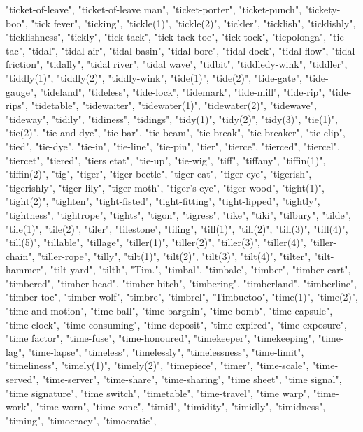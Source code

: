 "ticket-of-leave",
"ticket-of-leave man",
"ticket-porter",
"ticket-punch",
"tickety-boo",
"tick fever",
"ticking",
"tickle(1)",
"tickle(2)",
"tickler",
"ticklish",
"ticklishly",
"ticklishness",
"tickly",
"tick-tack",
"tick-tack-toe",
"tick-tock",
"ticpolonga",
"tic-tac",
"tidal",
"tidal air",
"tidal basin",
"tidal bore",
"tidal dock",
"tidal flow",
"tidal friction",
"tidally",
"tidal river",
"tidal wave",
"tidbit",
"tiddledy-wink",
"tiddler",
"tiddly(1)",
"tiddly(2)",
"tiddly-wink",
"tide(1)",
"tide(2)",
"tide-gate",
"tide-gauge",
"tideland",
"tideless",
"tide-lock",
"tidemark",
"tide-mill",
"tide-rip",
"tide-rips",
"tidetable",
"tidewaiter",
"tidewater(1)",
"tidewater(2)",
"tidewave",
"tideway",
"tidily",
"tidiness",
"tidings",
"tidy(1)",
"tidy(2)",
"tidy(3)",
"tie(1)",
"tie(2)",
"tie and dye",
"tie-bar",
"tie-beam",
"tie-break",
"tie-breaker",
"tie-clip",
"tied",
"tie-dye",
"tie-in",
"tie-line",
"tie-pin",
"tier",
"tierce",
"tierced",
"tiercel",
"tiercet",
"tiered",
"tiers etat",
"tie-up",
"tie-wig",
"tiff",
"tiffany",
"tiffin(1)",
"tiffin(2)",
"tig",
"tiger",
"tiger beetle",
"tiger-cat",
"tiger-eye",
"tigerish",
"tigerishly",
"tiger lily",
"tiger moth",
"tiger's-eye",
"tiger-wood",
"tight(1)",
"tight(2)",
"tighten",
"tight-fisted",
"tight-fitting",
"tight-lipped",
"tightly",
"tightness",
"tightrope",
"tights",
"tigon",
"tigress",
"tike",
"tiki",
"tilbury",
"tilde",
"tile(1)",
"tile(2)",
"tiler",
"tilestone",
"tiling",
"till(1)",
"till(2)",
"till(3)",
"till(4)",
"till(5)",
"tillable",
"tillage",
"tiller(1)",
"tiller(2)",
"tiller(3)",
"tiller(4)",
"tiller-chain",
"tiller-rope",
"tilly",
"tilt(1)",
"tilt(2)",
"tilt(3)",
"tilt(4)",
"tilter",
"tilt-hammer",
"tilt-yard",
"tilth",
"Tim.",
"timbal",
"timbale",
"timber",
"timber-cart",
"timbered",
"timber-head",
"timber hitch",
"timbering",
"timberland",
"timberline",
"timber toe",
"timber wolf",
"timbre",
"timbrel",
"Timbuctoo",
"time(1)",
"time(2)",
"time-and-motion",
"time-ball",
"time-bargain",
"time bomb",
"time capsule",
"time clock",
"time-consuming",
"time deposit",
"time-expired",
"time exposure",
"time factor",
"time-fuse",
"time-honoured",
"timekeeper",
"timekeeping",
"time-lag",
"time-lapse",
"timeless",
"timelessly",
"timelessness",
"time-limit",
"timeliness",
"timely(1)",
"timely(2)",
"timepiece",
"timer",
"time-scale",
"time-served",
"time-server",
"time-share",
"time-sharing",
"time sheet",
"time signal",
"time signature",
"time switch",
"timetable",
"time-travel",
"time warp",
"time-work",
"time-worn",
"time zone",
"timid",
"timidity",
"timidly",
"timidness",
"timing",
"timocracy",
"timocratic",
